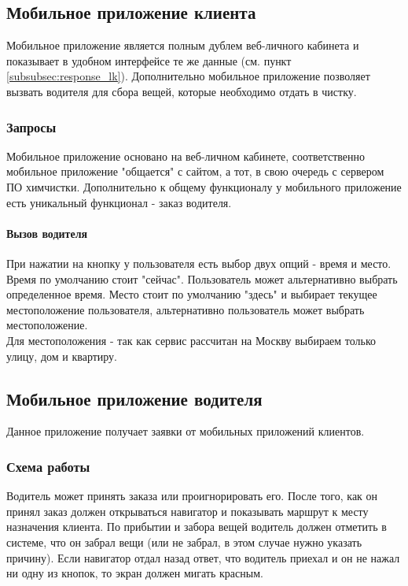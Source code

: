 \documentclass[DIV=calc, paper=a4, fontsize=11pt]{scrartcl} %
\begin{document}
\subsection{Мобильное приложение клиента}
Мобильное приложение является полным дублем веб-личного кабинета и показывает в удобном интерфейсе те же данные (см. пункт \ref{subsubsec:response_lk}). Дополнительно мобильное приложение позволяет вызвать водителя для сбора вещей, которые необходимо отдать в чистку.

\subsubsection{Запросы}
Мобильное приложение основано на веб-личном кабинете, соответственно мобильное приложение "общается" с сайтом, а тот, в свою очередь с сервером ПО химчистки. Дополнительно к общему функционалу у мобильного приложение есть уникальный функционал - заказ водителя.

\paragraph{Вызов водителя}
При нажатии на кнопку у пользователя есть выбор двух опций - время и место. Время по умолчанию стоит "сейчас". Пользователь может альтернативно выбрать определенное время. Место стоит по умолчанию "здесь" и выбирает текущее местоположение пользователя, альтернативно пользователь может выбрать местоположение.
\\[0.5cm]
Для местоположения - так как сервис рассчитан на Москву выбираем только улицу, дом и квартиру.

\subsection{Мобильное приложение водителя}
Данное приложение получает заявки от мобильных приложений клиентов. 

\subsubsection{Схема работы}
Водитель может принять заказа или проигнорировать его. После того, как он принял заказ должен открываться навигатор и показывать маршрут к месту назначения клиента. По прибытии и забора вещей водитель должен отметить в системе, что он забрал вещи (или не забрал, в этом случае нужно указать причину). Если навигатор отдал назад ответ, что водитель приехал и он не нажал ни одну из кнопок, то экран должен мигать красным.
\end{document}
